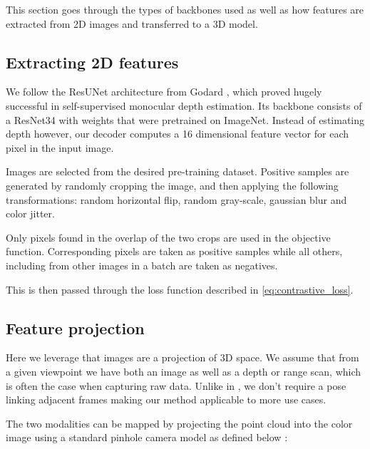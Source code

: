 \documentclass[10pt,twocolumn,letterpaper]{article}
\newcommand{\AJ}[1]{{\color{red}{[Andrej: #1]}}}
\begin{document}
This section goes through the types of backbones used as well as how features are extracted from 2D images and transferred to a 3D model.

\AJ{Need a picture depicting the pipeline}

\subsection{Extracting 2D features}
\label{sec:method:features2d}

We follow the ResUNet architecture from Godard \etal \cite{godard2019Digging}, which proved hugely successful in self-supervised monocular depth estimation. Its backbone consists of a ResNet34 with weights that were pretrained on ImageNet. Instead of estimating depth however, our decoder computes a 16 dimensional feature vector for each pixel in the input image.

Images are selected from the desired pre-training dataset. Positive samples are generated by randomly cropping the image, and then applying the following transformations: random horizontal flip, random gray-scale, gaussian blur and color jitter.

Only pixels found in the overlap of the two crops are used in the objective function. Corresponding pixels are taken as positive samples while all others, including from other images in a batch are taken as negatives.

This is then passed through the loss function described in \ref{eq:contrastive_loss}.

\subsection{Feature projection}
\label{sec:featureProjection}

Here we leverage that images are a projection of 3D space. We assume that from a given viewpoint we have both an image as well as a depth or range scan, which is often the case when capturing raw data. Unlike in \cite{xie2020pointcontrast}, we don't require a pose linking adjacent frames making our method applicable to more use cases.

The two modalities can be mapped by projecting the point cloud into the color image using a standard pinhole camera model as defined below \cite{?}:
\end{document}
